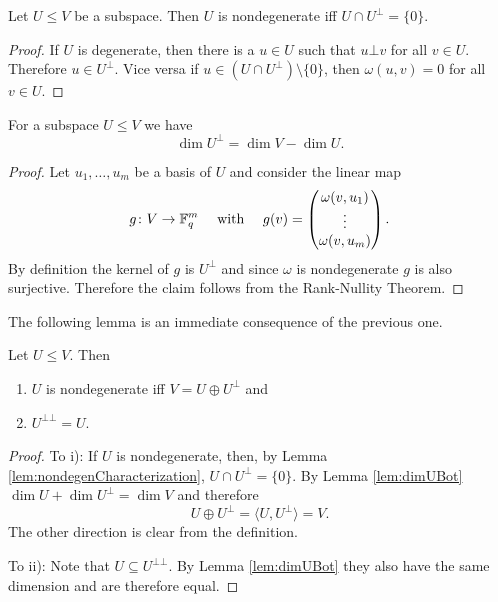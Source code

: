 \begin{lemma}\label{lem:nondegenCharacterization}
	Let $U\leq V$ be a subspace. Then $U$ is nondegenerate iff $U\cap U^\bot=\{0\}$.
\end{lemma}
\begin{proof}
	If $U$ is degenerate, then there is a $u\in U$ such that $u\bot v$ for all $v\in U$. Therefore $u\in U^\bot$. Vice versa if $u\in (U\cap U^\bot)\setminus\{0\}$, then $\omega(u,v)=0$ for all $v\in U$.
\end{proof}
		
		
\begin{lemma}\label{lem:dimUBot}
	For a subspace $U\leq V$ we have 
	\[\dim U^\bot= \dim V -\dim U.\]
\end{lemma}
\begin{proof}
	Let $u_1,\dots,u_m$ be a basis of $U$ and consider the linear map
	\begin{align*}g\colon V\to \mathbb{F}_q^m&&\text{ with }&&g(v)=
		\begin{pmatrix} 
		\omega(v,u_1)   \\
		\vdots          \\
		\omega(v,u_m)   
		\end{pmatrix}.  
	\end{align*}
	By definition the kernel of $g$ is $U^\bot$ and since $\omega$ is nondegenerate $g$ is also surjective. Therefore the claim follows from the Rank-Nullity Theorem.
\end{proof}
		
		
The following lemma is an immediate consequence of the previous one.
\begin{lemma}\label{lem:Ubotbot}
	Let $U\leq V$. Then
	\begin{enumerate}[label=\roman{*})]
		\item $U$ is nondegenerate iff $V=U\oplus U^\bot$ and
		\item $U^{\bot\bot}=U$.
	\end{enumerate}
\end{lemma}
\begin{proof}
	To i):
	If $U$ is nondegenerate, then, by Lemma \ref{lem:nondegenCharacterization}, $U\cap U^\bot=\{0\}$. By Lemma \ref{lem:dimUBot} $\dim U + \dim U^\bot =\dim V$ and therefore
	\[U\oplus U^\bot=\langle U,U^\bot\rangle=V.\]
	The other direction is clear from the definition.
				
	To ii): Note that $U\subseteq U^{\bot\bot}$. By Lemma \ref{lem:dimUBot} they also have the same dimension and are therefore equal.
\end{proof}
		
